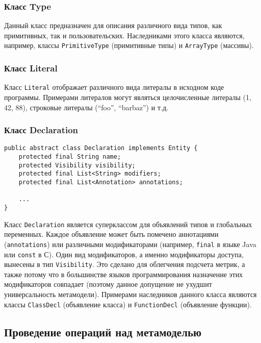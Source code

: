 \vspace{10pt}
\subsubsection{Класс Type}

Данный класс предназначен для описания различного вида типов, как примитивных,
так и пользовательских. Наследниками этого класса являются, например, классы
\texttt{PrimitiveType} (примитивные типы) и \texttt{ArrayType} (массивы).

\subsubsection{Класс Literal}

Класс \texttt{Literal} отображает различного вида литералы в исходном коде
программы. Примерами литералов могут являться целочисленные литералы (1, 42, 88),
строковые литералы (``foo'', ``barbaz'') и т.д.

\newpage
\subsubsection{Класс Declaration}

\begin{lstlisting}[caption={Класс Declaration}]
public abstract class Declaration implements Entity {
    protected final String name;
    protected Visibility visibility;
    protected final List<String> modifiers;
    protected final List<Annotation> annotations;

    ...
}
\end{lstlisting}

Класс \texttt{Declaration} является суперклассом для объявлений типов и
глобальных переменных. Каждое объявление может быть помечено аннотациями
(\texttt{annotations}) или различными модификаторами (например, \texttt{final} в
языке Java или \texttt{const} в С). Один вид модификаторов, а именно
модификаторы доступа, вынесены в тип \texttt{Visibility}. Это сделано для
облегчения подсчета метрик, а также потому что в большинстве языков
программирования назначение этих модификаторов совпадает (поэтому данное
допущение не ухудшит универсальность метамодели). Примерами наследников данного
класса являются классы \texttt{ClassDecl} (объявление класса) и
\texttt{FunctionDecl} (объявление функции).

\vspace{10pt}
\subsection{Проведение операций над метамоделью}
\label{subsec:metamodel_operations}

